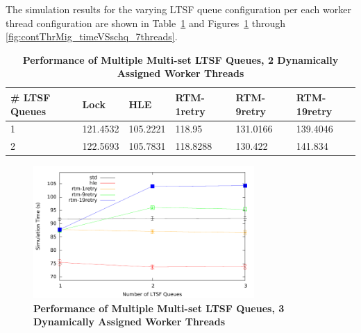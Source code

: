 \documentclass[11pt]{book}
\begin{document}
The simulation results for the varying LTSF queue configuration per each worker
thread configuration are shown in Table~\ref{tab:contThrMig_2threadsXschq} and
Figures~\ref{fig:contThrMig_timeVSschq_3threads} through
\ref{fig:contThrMig_timeVSschq_7threads}.


\begin{table}
    \centering
    \begin{tabular}{l|p{2cm}|p{2cm}|p{2cm}|p{2cm}|p{2cm}}
        \textbf{\# LTSF Queues}&Lock &HLE &RTM-1retry &RTM-9retry &RTM-19retry \\
        \hline
        \midrule
            1 &121.4532  &105.2221 &118.95   &131.0166 &139.4046 \\ 
            2 &122.5693  &105.7831 &118.8288 &130.422  &141.834  \\
    \end{tabular}
    \caption{\textbf{Performance of Multiple Multi-set LTSF Queues, 2 Dynamically Assigned Worker Threads}}
    \label{tab:contThrMig_2threadsXschq}
\end{table}

\begin{figure}
    \centering
    \graphicspath{ {./figures/} }
    \includegraphics[width=0.75\textwidth,keepaspectratio]{hugeepidemicsim-CONTmig-timeVSschedQs-multiset-3thread}
    \caption{\textbf{Performance of Multiple Multi-set LTSF Queues, 3 Dynamically Assigned Worker Threads}}
    \label{fig:contThrMig_timeVSschq_3threads}
\end{figure}
\end{document}
